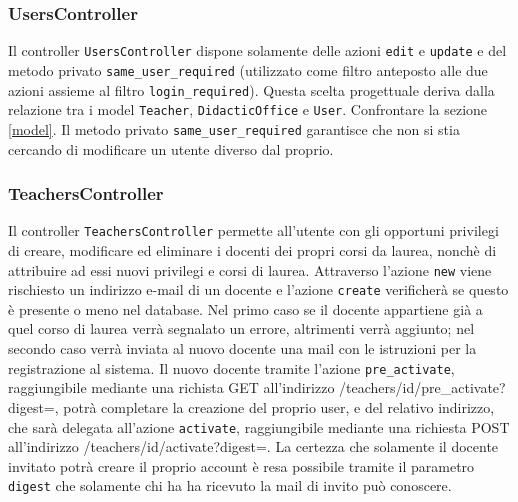 \documentclass[11pt,a4paper]{article}
\begin{document}
\subsubsection{UsersController}
Il controller \verb|UsersController| dispone solamente delle azioni \verb|edit| e \verb|update| e del metodo privato \verb|same_user_required| (utilizzato come filtro anteposto alle due azioni assieme al filtro \verb|login_required|). Questa scelta progettuale deriva dalla relazione tra i model \verb|Teacher|, \verb|DidacticOffice| e \verb|User|. Confrontare la sezione \ref{model}.
Il metodo privato \verb|same_user_required| garantisce che non si stia cercando di modificare un utente diverso dal proprio.
\subsubsection{TeachersController}
Il controller \verb|TeachersController| permette all'utente con gli opportuni privilegi di creare, modificare ed eliminare i docenti dei propri corsi da laurea, nonchè di attribuire ad essi nuovi privilegi e corsi di laurea. Attraverso l'azione \verb|new| viene rischiesto un indirizzo e-mail di un docente e l'azione \verb|create| verificherà se questo è presente o meno nel database. Nel primo caso se il docente appartiene già a quel corso di laurea verrà segnalato un errore, altrimenti verrà aggiunto; nel secondo caso verrà inviata al nuovo docente una mail con le istruzioni per la registrazione al sistema. Il nuovo docente tramite l'azione \verb|pre_activate|, raggiungibile mediante una richista GET all'indirizzo /teachers/id/pre\_activate?digest=, potrà completare la creazione del proprio user, e del relativo indirizzo, che sarà delegata all'azione \verb|activate|, raggiungibile mediante una richiesta POST all'indirizzo /teachers/id/activate?digest=. La certezza che solamente il docente invitato potrà creare il proprio account è resa possibile tramite il parametro \verb|digest| che solamente chi ha ha ricevuto la mail di invito può conoscere.
\end{document}

